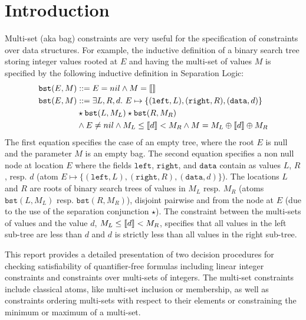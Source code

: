 
\section{Introduction}
\label{sec:intro}

Multi-set (aka bag) constraints are very useful for the specification of constraints over data structures.
For example, the inductive definition of a binary search tree storing integer values rooted at $E$ and having the multi-set of values $M$ is
specified by the following inductive definition in Separation Logic:
\begin{align}
\mathtt{bst}(E,M) &::= E = nil \land M=\llbracket  \rrbracket \\
\mathtt{bst}(E,M) &::= \exists L, R, d.\ E\mapsto \{(\mathtt{left},L), (\mathtt{right}, R), (\mathtt{data}, d)\}  \\
& \star \mathtt{bst}(L, M_L) \star \mathtt{bst}(R,M_R) \nonumber \\
& \land E\neq nil \land M_L \le \llbracket d \rrbracket < M_R \land M=M_L \oplus \llbracket d \rrbracket \oplus M_R \nonumber
\end{align}
The first equation specifies the case of an empty tree, where the root $E$ is null and the parameter $M$ is an empty bag.
The second equation specifies a non null node at location $E$ where the fields $\mathtt{left}$, $\mathtt{right}$, and $\mathtt{data}$ contain as values
$L$, $R$, resp. $d$ (atom $E\mapsto \{(\mathtt{left},L), (\mathtt{right}, R), (\mathtt{data}, d)\}$).
The locations $L$ and $R$ are roots of binary search trees of values in $M_L$ resp. $M_R$ (atoms $ \mathtt{bst}(L, M_L)$ resp.  $\mathtt{bst}(R,M_R)$),
disjoint pairwise and from the node at $E$ (due to the use of the separation conjunction $\star$).
The constraint between the multi-sets of values and the value $d$, $M_L \le \llbracket d \rrbracket < M_R$, specifies that
all values in the left sub-tree are less than $d$ and $d$ is strictly less than all values in the right sub-tree.

This report provides a detailed presentation of two decision procedures for checking satisfiability of quantifier-free formulas including
linear integer constraints and
constraints over multi-sets of integers. 
The multi-set constraints include classical atoms, like multi-set inclusion or membership, as well as
constraints ordering multi-sets with respect to their elements or constraining the minimum or maximum of a multi-set.

